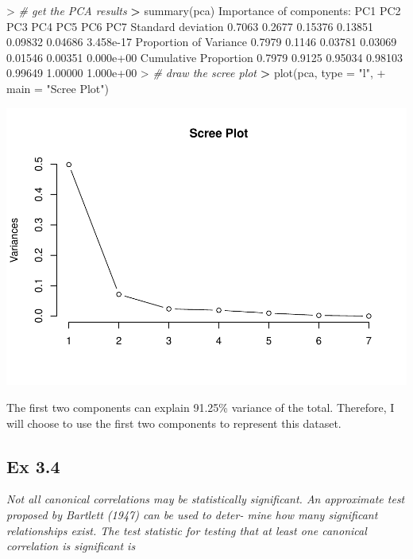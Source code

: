 \documentclass[
]{article}
\newenvironment{Shaded}{\begin{snugshade}}{\end{snugshade}}
\newcommand{\AttributeTok}[1]{\textcolor[rgb]{0.77,0.63,0.00}{#1}}
\newcommand{\CommentTok}[1]{\textcolor[rgb]{0.56,0.35,0.01}{\textit{#1}}}
\newcommand{\ErrorTok}[1]{\textcolor[rgb]{0.64,0.00,0.00}{\textbf{#1}}}
\newcommand{\FloatTok}[1]{\textcolor[rgb]{0.00,0.00,0.81}{#1}}
\newcommand{\FunctionTok}[1]{\textcolor[rgb]{0.00,0.00,0.00}{#1}}
\newcommand{\NormalTok}[1]{#1}
\newcommand{\SpecialCharTok}[1]{\textcolor[rgb]{0.00,0.00,0.00}{#1}}
\newcommand{\StringTok}[1]{\textcolor[rgb]{0.31,0.60,0.02}{#1}}
\begin{document}
\begin{Shaded}
\begin{Highlighting}[]
\SpecialCharTok{\textgreater{}} \CommentTok{\# get the PCA results}
\ErrorTok{\textgreater{}} \FunctionTok{summary}\NormalTok{(pca)}
\NormalTok{Importance of components}\SpecialCharTok{:}
\NormalTok{                          PC1    PC2     PC3     PC4     PC5     PC6       PC7}
\NormalTok{Standard deviation     }\FloatTok{0.7063} \FloatTok{0.2677} \FloatTok{0.15376} \FloatTok{0.13851} \FloatTok{0.09832} \FloatTok{0.04686} \FloatTok{3.458e{-}17}
\NormalTok{Proportion of Variance }\FloatTok{0.7979} \FloatTok{0.1146} \FloatTok{0.03781} \FloatTok{0.03069} \FloatTok{0.01546} \FloatTok{0.00351} \FloatTok{0.000e+00}
\NormalTok{Cumulative Proportion  }\FloatTok{0.7979} \FloatTok{0.9125} \FloatTok{0.95034} \FloatTok{0.98103} \FloatTok{0.99649} \FloatTok{1.00000} \FloatTok{1.000e+00}
\SpecialCharTok{\textgreater{}} \CommentTok{\# draw the scree plot }
\ErrorTok{\textgreater{}} \FunctionTok{plot}\NormalTok{(pca, }\AttributeTok{type =} \StringTok{"l"}\NormalTok{, }
\SpecialCharTok{+}      \AttributeTok{main =} \StringTok{"Scree Plot"}\NormalTok{)}
\end{Highlighting}
\end{Shaded}

\includegraphics[width=0.7\linewidth,height=0.5\textheight]{HUDM6122-Homework_03-Chenguang-Pan_files/figure-latex/unnamed-chunk-4-1}

The first two components can explain 91.25\% variance of the total.
Therefore, I will choose to use the first two components to represent
this dataset.

\hypertarget{ex-3.4}{%
\subsection{Ex 3.4}\label{ex-3.4}}

\emph{Not all canonical correlations may be statistically significant.
An approximate test proposed by Bartlett (1947) can be used to deter-
mine how many significant relationships exist. The test statistic for
testing that at least one canonical correlation is significant is}
\end{document}
